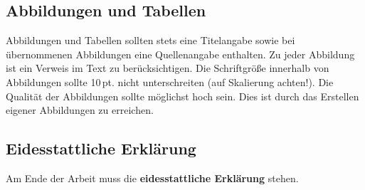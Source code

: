 \subsection{Abbildungen und Tabellen}
\label{sub:Abbildungen und Tabellen}

Abbildungen und Tabellen sollten stets eine Titelangabe sowie bei übernommenen Abbildungen eine Quellenangabe enthalten. Zu jeder Abbildung ist ein Verweis im Text zu berücksichtigen. Die Schriftgröße innerhalb von Abbildungen sollte 10\,pt. nicht unterschreiten (auf Skalierung achten!). Die Qualität der Abbildungen sollte möglichst hoch sein. Dies ist durch das Erstellen eigener Abbildungen zu erreichen.

\subsection{Eidesstattliche Erklärung}
\label{sub:Eidesstattliche Erklärung}

Am Ende der Arbeit muss die \textbf{eidesstattliche Erklärung} stehen. 

